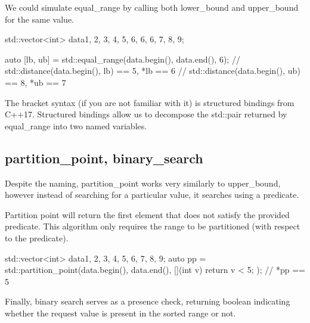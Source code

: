 

We could simulate equal\_range by calling both lower\_bound and upper\_bound for the same value.

\begin{box-note}
\begin{cppcode}
std::vector<int> data{1, 2, 3, 4, 5, 6, 6, 6, 7, 8, 9};

auto [lb, ub] = std::equal_range(data.begin(), data.end(), 6);
// std::distance(data.begin(), lb) == 5, *lb == 6
// std::distance(data.begin(), ub) == 8, *ub == 7
\end{cppcode}
\end{box-note}

The bracket syntax (if you are not familiar with it) is structured bindings from C++17. Structured bindings allow us to decompose the std::pair returned by equal\_range into two named variables.

\subsection{partition\_point, binary\_search}

Despite the naming, partition\_point works very similarly to upper\_bound, however instead of searching for a particular value, it searches using a predicate.



Partition point will return the first element that does not satisfy the provided predicate. This algorithm only requires the range to be partitioned (with respect to the predicate).

\begin{box-note}
\begin{cppcode}
std::vector<int> data{1, 2, 3, 4, 5, 6, 7, 8, 9};
auto pp = std::partition_point(data.begin(), data.end(), 
                                [](int v) { return v < 5; });
// *pp == 5
\end{cppcode}
\end{box-note}

Finally, binary search serves as a presence check, returning boolean indicating whether the request value is present in the sorted range or not.

